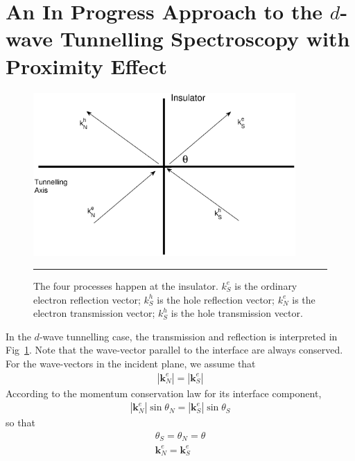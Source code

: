 \section{An In Progress Approach to the $d$-wave Tunnelling Spectroscopy with Proximity Effect}
\begin{figure}[htbp]
\small
	\centering
		\includegraphics[width=10cm]{./Figures/3-5-1.eps}
		\rule{35em}{0.5pt}
	\caption[An Electron]{The four processes happen at the insulator. $k_S^e$ is the ordinary electron reflection vector;  $k_S^h$ is the hole reflection vector; $k_N^e$ is the electron transmission vector; $k_S^h$ is the hole transmission vector.}
	\label{fig:Andreev}
\end{figure}
In the $d$-wave tunnelling case, the transmission and reflection is interpreted in Fig~\ref{fig:Andreev}.  Note that the wave-vector parallel to the interface are always conserved. For the wave-vectors in the incident plane, we assume that 
\begin{eqnarray}
|\mathbf{k}_N^e|=|\mathbf{k}_S^e|
\end{eqnarray}
According to the momentum conservation law for its interface component,
\begin{eqnarray}
|\mathbf{k}_N^e|\sin\theta_N=|\mathbf{k}_S^e|\sin\theta_S
\end{eqnarray}
so that
\begin{eqnarray}
\theta_S=\theta_N=\theta\nonumber\\
\mathbf{k}_N^e=\mathbf{k}_S^e
\end{eqnarray}

